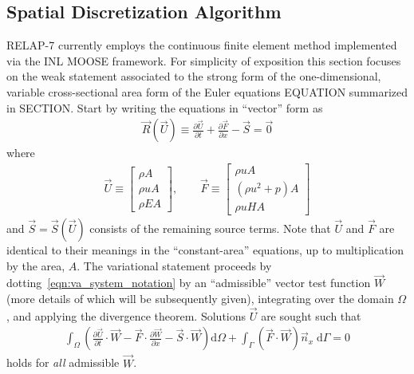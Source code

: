 \subsection{Spatial Discretization Algorithm\label{sec:spatial_discretization}}
%
RELAP-7 currently employs the continuous finite element method implemented
via the INL MOOSE framework.  For simplicity of exposition this section focuses on
the weak statement associated to the strong form of the one-dimensional, variable
cross-sectional area form of the Euler equations EQUATION
summarized in SECTION.  Start by writing the
equations in ``vector'' form as
\begin{align}
  \label{eqn:va_system_notation}
  \vec{R}(\vec{U}) \equiv \frac{\partial \vec{U}}{\partial t} + \frac{\partial \vec{F}}{\partial x} - \vec{S} = \vec{0}
\end{align}
where
\begin{align}
  \vec{U} \equiv
  \begin{bmatrix}
    \rho A
    \\
    \rho u A
    \\
    \rho E A
  \end{bmatrix},
  \qquad
  \vec{F} \equiv
  \begin{bmatrix}
    \rho u A
    \\
    \left(\rho u^2 + p\right) A
    \\
    \rho u H A
  \end{bmatrix}
\end{align}
and $\vec{S} = \vec{S}(\vec{U})$ consists of the remaining source
terms.  Note that $\vec{U}$ and $\vec{F}$ are identical to their
meanings in the ``constant-area'' equations, up to multiplication by
the area, $A$.
%
The variational statement proceeds by
dotting~\eqref{eqn:va_system_notation} by an ``admissible'' vector test function
$\vec{W}$ (more details of which will be subsequently given),
integrating over the domain $\Omega$, and applying the divergence
theorem.  Solutions $\vec{U}$ are sought such that
\begin{align}
  \label{eqn:va_system_weak}
  \int_{\Omega} \left(\frac{\partial \vec{U}}{\partial t} \cdot \vec{W} - \vec{F}\cdot \frac{\partial \vec{W}}{\partial x} - \vec{S}\cdot\vec{W} \right) \text{d}\Omega
  + \int_{\Gamma} \left( \vec{F} \cdot \vec{W} \right) \vec{n}_x \;\text{d}\Gamma = 0
\end{align}
holds for \emph{all} admissible $\vec{W}$.

